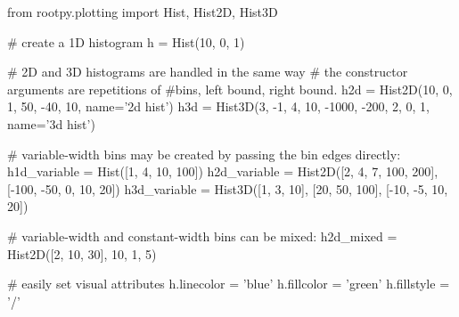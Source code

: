\begin{footnotesize}
\begin{pyglist}[language=python,texcl=true,abovecaptionskip=0,style=vs,bgcolor=Moccasin]
from rootpy.plotting import Hist, Hist2D, Hist3D

# create a 1D histogram
h = Hist(10, 0, 1)

# 2D and 3D histograms are handled in the same way
# the constructor arguments are repetitions of #bins, left bound, right bound.
h2d = Hist2D(10, 0, 1, 50, -40, 10, name='2d hist')
h3d = Hist3D(3, -1, 4, 10, -1000, -200, 2, 0, 1, name='3d hist')

# variable-width bins may be created by passing the bin edges directly:
h1d_variable = Hist([1, 4, 10, 100])
h2d_variable = Hist2D([2, 4, 7, 100, 200], [-100, -50, 0, 10, 20])
h3d_variable = Hist3D([1, 3, 10], [20, 50, 100], [-10, -5, 10, 20])

# variable-width and constant-width bins can be mixed:
h2d_mixed = Hist2D([2, 10, 30], 10, 1, 5)

# easily set visual attributes
h.linecolor = 'blue'
h.fillcolor = 'green'
h.fillstyle = '/'
\end{pyglist}
\end{footnotesize}
